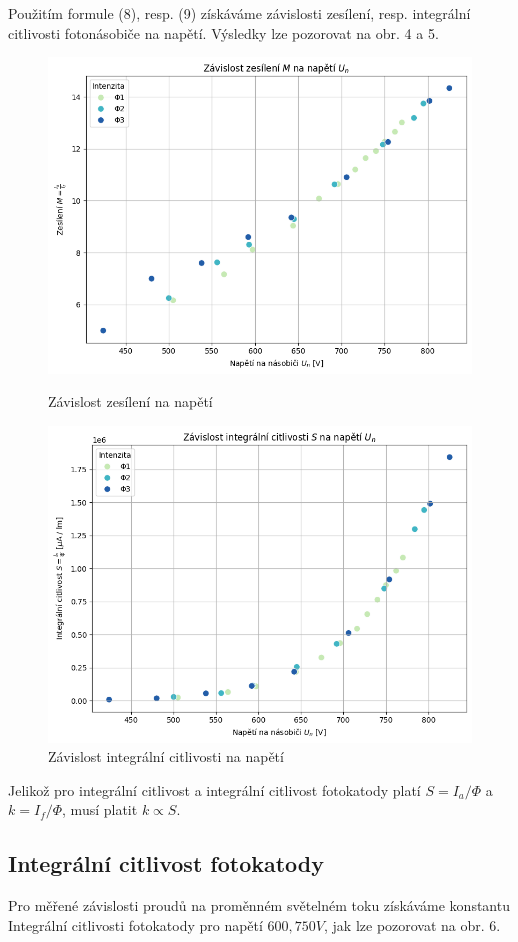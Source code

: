 \documentclass[czech,11pt,a4paper]{article}
\begin{document}
\begin{multicols}{2}
\begin{figure}[H]
		\end{figure}
		Použitím formule (8), resp. (9) získáváme závislosti zesílení, resp. integrální citlivosti fotonásobiče na napětí. Výsledky lze pozorovat na obr. 4 a 5.
		\begin{figure}[H]
			\centering
			\includegraphics[width=0.9\linewidth]{fig2}
			\caption{Závislost zesílení na napětí}
			\includegraphics[width=0.9\linewidth]{fig3}
			\caption{Závislost integrální citlivosti na napětí}
			
		\end{figure}
		Jelikož pro integrální citlivost a integrální citlivost fotokatody platí $S = I_a / \Phi$ a $k = I_f / \Phi$, musí platit $k \propto S$.
		\subsection{Integrální citlivost fotokatody}
		Pro měřené závislosti proudů na proměnném světelném toku získáváme konstantu Integrální citlivosti fotokatody pro napětí $600, 750V$, jak lze pozorovat na obr. 6.
		

\end{multicols}
\end{document}
